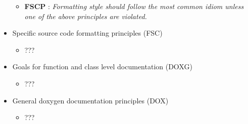 \begin{itemize}
\begin{itemize}
  {}\item{}\textbf{FSCP
  {}}: {}\textit{Formatting style should follow the
  most common idiom unless one of the above principles are violated.}

  \end{itemize}

\item Specific source code formatting principles (FSC)

  \begin{itemize}

  \item ???

  \end{itemize}

\item Goals for function and class level documentation (DOXG)

  \begin{itemize}

  \item ???

  \end{itemize}

\item General doxygen documentation principles (DOX)

  \begin{itemize}

  \item ???

  \end{itemize}

\end{itemize}
